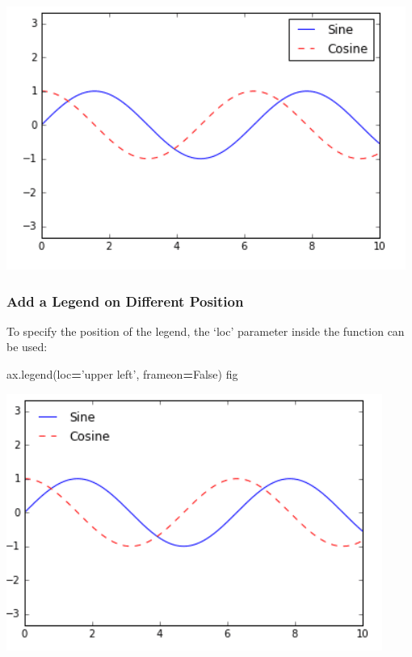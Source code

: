 \documentclass[]{book}
\newenvironment{Shaded}{\begin{snugshade}}{\end{snugshade}}
\newcommand{\NormalTok}[1]{#1}
\newcommand{\OperatorTok}[1]{\textcolor[rgb]{0.81,0.36,0.00}{\textbf{#1}}}
\newcommand{\StringTok}[1]{\textcolor[rgb]{0.31,0.60,0.02}{#1}}
\newcommand{\VariableTok}[1]{\textcolor[rgb]{0.00,0.00,0.00}{#1}}
\begin{document}
\includegraphics{images/legend1.png}

\hypertarget{add-a-legend-on-different-position}{%
\subsubsection{Add a Legend on Different Position}\label{add-a-legend-on-different-position}}

To specify the position of the legend, the `loc' parameter inside the function can be used:

\begin{Shaded}
\begin{Highlighting}[]
\NormalTok{ax.legend(loc}\OperatorTok{=}\StringTok{'upper left'}\NormalTok{, frameon}\OperatorTok{=}\VariableTok{False}\NormalTok{)}
\NormalTok{fig}
\end{Highlighting}
\end{Shaded}

\includegraphics{images/legend2.png}
\end{document}
